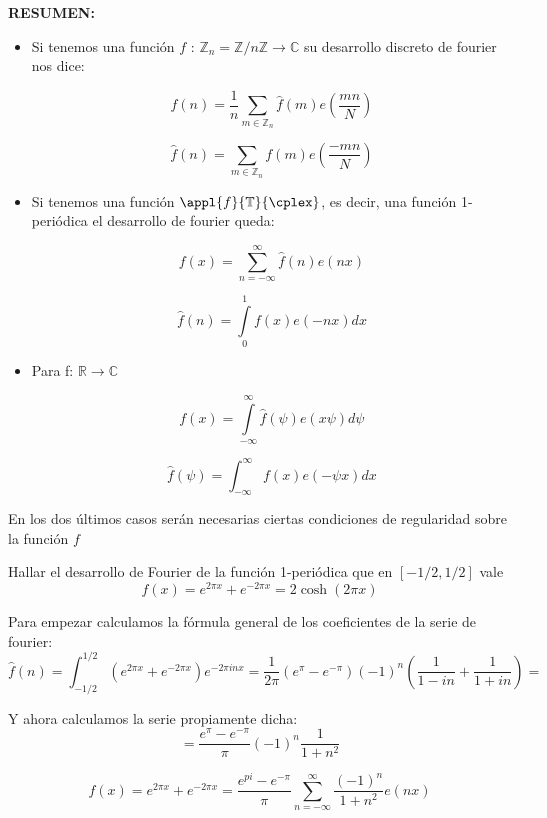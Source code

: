 \newpage
\begin{mdframed}
\textbf{RESUMEN:}

\begin{itemize}

\item Si tenemos una función $f$ : $\mathbb{Z}_{n} = \mathbb{Z} / n \mathbb{Z} \rightarrow \mathbb{C}$ su desarrollo discreto de fourier nos dice:

$$ f(n) = \frac{1}{n} \sum_{m \in \mathbb{Z}_{n}} \hat{f}(m) e \left( \frac{mn}{N} \right) $$

$$ \hat{f}(n) = \sum_{m \in \mathbb{Z}_{n}} f(m) e \left( \frac{-mn}{N} \right)$$

\item Si tenemos una función $\appl{f}{\mathbb{T}}{\cplex}$, es decir, una función 1-periódica el desarrollo de fourier queda:

$$ f(x) = \sum^{\infty}_{n = -\infty} \hat{f} (n) e (nx) $$

$$ \hat{f} (n) = \int\limits_{0}^{1} f(x) e (-nx) dx $$

\item Para f: $\mathbb{R} \rightarrow \mathbb{C}$

$$ f(x) = \int\limits^{\infty}_{-\infty} \hat{f}(\psi) e(x \psi) d\psi $$

$$ \hat{f}(\psi) = \int^{\infty}_{-\infty} f(x) e(-\psi x)dx$$

\end{itemize}
\end{mdframed}
\obs En los dos últimos casos serán necesarias ciertas condiciones de regularidad sobre la función $f$

\begin{example}

	Hallar el desarrollo de Fourier de la función 1-periódica que en $[-1/2, 1/2]$ vale
	\[f(x)=e^{2\pi x} + e^{-2\pi x } = 2 \cosh (2 \pi x)\]

	Para empezar calculamos la fórmula general de los coeficientes de la serie de fourier:
	$$\hat{f}(n) = \int ^{1/2}_{-1/2} \left( e^{2 \pi x} + e ^{-2 \pi x} \right) e ^{-2 \pi i n x} = \frac{1}{2 \pi} (e^{\pi} - e^{-\pi}) (-1)^{n} \left( \frac{1}{1-in} + \frac{1}{1 + in} \right) =$$

	Y ahora calculamos la serie propiamente dicha:
	$$ = \frac{e^{\pi} - e^{-\pi}}{\pi} (-1)^{n} \frac{1}{1 + n^2}$$

	$$ f(x) = e ^{2 \pi x} + e^{-2 \pi x} = \frac{e^{pi} - e^{-\pi}}{\pi} \sum_{n = -\infty}^{\infty} \frac{(-1)^n}{1 + n^2} e(nx) $$

\end{example}


